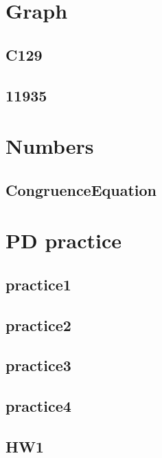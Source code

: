 

\section{Graph}
    \subsection{C129}
        
    \subsection{11935}
        

\section{Numbers}
    \subsection{CongruenceEquation}
        

\section{PD practice}
    \subsection{practice1}
        
    \subsection{practice2}
        
    \subsection{practice3}
        
    \subsection{practice4}
        
    \subsection{HW1}
        
